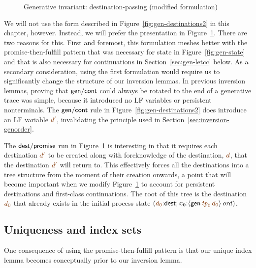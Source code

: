 \begin{figure}[tp]
\caption{Generative invariant: destination-passing (modified formulation)}
\label{fig:gen-destinations} 
\end{figure}

We will not use the form described in
Figure~\ref{fig:gen-destinations2} in this chapter, however. Instead,
we will prefer the presentation in Figure~\ref{fig:gen-destinations}.
There are two reasons for this. First and foremost, this formulation
meshes better with the promise-then-fulfill pattern that was necessary
for state in Figure~\ref{fig:gen-state} and that is also necessary for
continuations in Section~\ref{sec:gen-letcc} below. As a secondary
consideration, using the first formulation would require us to 
significantly change the structure of our inversion lemmas.
In previous inversion lemmas, proving
that ${\sf gen/cont}$ could always be rotated to the end of a
generative trace was simple, because it introduced no LF variables or
persistent nonterminals. The ${\sf gen/cont}$ rule in
Figure~\ref{fig:gen-destinations2} does introduce an LF variable
$\lf{d'}$, invalidating the principle used in
Section~\ref{sec:inversion-genorder}.

The ${\sf dest/promise}$ run in Figure~\ref{fig:gen-destinations} is
interesting in that it requires each destination $\lf{d'}$ to be
created along with foreknowledge of the destination, $\lf{d}$, that
the destination $\lf{d'}$ will return to. This effectively forces all
the destinations into a tree structure from the moment of their
creation onwards, a point that will become important when we modify
Figure~\ref{fig:gen-destinations} to account for persistent
destinations and first-class continuations. The root of this tree is the
destination $\lf{d_0}$ that already exists in the initial process state
$(\lf{d_0}{:}{\sf dest};
x_0{:}\istrue{\susp{{\sf gen}\,\lf{{\it tp}_0}\,\lf{d_0}}})$.

\subsection{Uniqueness and index sets}
\label{sec:uniqueness-gendests}

One consequence of using the promise-then-fulfill pattern is that our
unique index lemma becomes conceptually prior to our inversion lemma.

